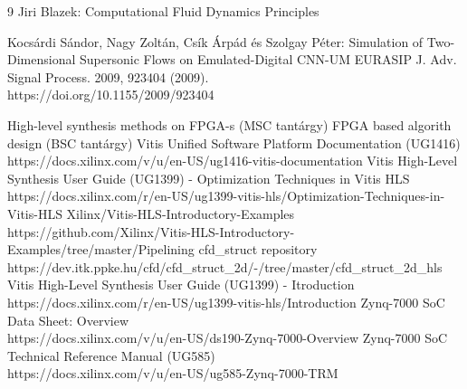 \documentclass{article}
\begin{document}
\begin{thebibliography}{9}
Jiri Blazek: Computational Fluid Dynamics Principles

Kocsárdi Sándor, Nagy Zoltán, Csík Árpád és Szolgay Péter: Simulation of Two-Dimensional Supersonic Flows on Emulated-Digital CNN-UM EURASIP J. Adv. Signal Process. 2009, 923404 (2009). \\https://doi.org/10.1155/2009/923404

High-level synthesis methods on FPGA-s (MSC tantárgy)
FPGA based algorith design (BSC tantárgy)
Vitis Unified Software Platform Documentation (UG1416) \\https://docs.xilinx.com/v/u/en-US/ug1416-vitis-documentation
Vitis High-Level Synthesis User Guide (UG1399) - Optimization Techniques in Vitis HLS \\https://docs.xilinx.com/r/en-US/ug1399-vitis-hls/Optimization-Techniques-in-Vitis-HLS
Xilinx/Vitis-HLS-Introductory-Examples \\https://github.com/Xilinx/Vitis-HLS-Introductory-Examples/tree/master/Pipelining
cfd\_struct repository \\https://dev.itk.ppke.hu/cfd/cfd\_struct\_2d/-/tree/master/cfd\_struct\_2d\_hls
Vitis High-Level Synthesis User Guide (UG1399) - Itroduction 
\\ https://docs.xilinx.com/r/en-US/ug1399-vitis-hls/Introduction
Zynq-7000 SoC Data Sheet: Overview \\https://docs.xilinx.com/v/u/en-US/ds190-Zynq-7000-Overview
Zynq-7000 SoC Technical Reference Manual (UG585) \\https://docs.xilinx.com/v/u/en-US/ug585-Zynq-7000-TRM
\end{thebibliography}
\end{document}

